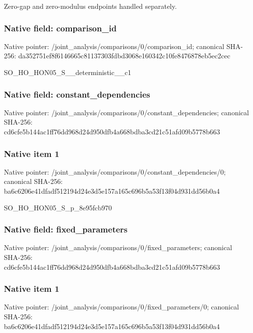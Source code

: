 \documentclass[10pt,a4paper]{article}
\begin{document}
\begingroup\raggedright\sloppy Zero-gap and zero-modulus endpoints handled separately.\par\endgroup

\subsubsection{Native field: comparison\_\allowbreak{}id}
Native pointer: /joint\_\allowbreak{}analysis/comparisons/0/comparison\_\allowbreak{}id; canonical SHA-256: da352751ef8f6146665c81137303fdbd3068e160342c10fe8476878eb5ec2cec

\begingroup\raggedright\sloppy SO\_\allowbreak{}HO\_\allowbreak{}HON05\_\allowbreak{}S\_\allowbreak{}\_\allowbreak{}deterministic\_\allowbreak{}\_\allowbreak{}c1\par\endgroup

\subsubsection{Native field: constant\_\allowbreak{}dependencies}
Native pointer: /joint\_\allowbreak{}analysis/comparisons/0/constant\_\allowbreak{}dependencies; canonical SHA-256: cd6cfe5b144ac1ff76dd968d24d950dfb4a668bdba3cd21c51afd09b5778b663

\subsubsection{Native item 1}
Native pointer: /joint\_\allowbreak{}analysis/comparisons/0/constant\_\allowbreak{}dependencies/0; canonical SHA-256: ba6c6206e41dfadf512194d24e3d5e157a165c696b5a53f13f04d931dd56b0a4

\begingroup\raggedright\sloppy SO\_\allowbreak{}HO\_\allowbreak{}HON05\_\allowbreak{}S\_\allowbreak{}p\_\allowbreak{}8e95fcb970\par\endgroup

\subsubsection{Native field: fixed\_\allowbreak{}parameters}
Native pointer: /joint\_\allowbreak{}analysis/comparisons/0/fixed\_\allowbreak{}parameters; canonical SHA-256: cd6cfe5b144ac1ff76dd968d24d950dfb4a668bdba3cd21c51afd09b5778b663

\subsubsection{Native item 1}
Native pointer: /joint\_\allowbreak{}analysis/comparisons/0/fixed\_\allowbreak{}parameters/0; canonical SHA-256: ba6c6206e41dfadf512194d24e3d5e157a165c696b5a53f13f04d931dd56b0a4
\end{document}
